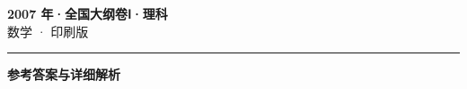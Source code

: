 \documentclass[zihao=5, a4paper]{ctexart}
\begin{document}
\begin{center}
  {\Large\bfseries 2007 年·全国大纲卷Ⅰ·理科}\\[4pt]
  {\large 数学 · 印刷版}
\end{center}
\medskip
{}

\par\bigskip\hrule\bigskip
{}
\begin{center}{\large\bfseries 参考答案与详细解析}\end{center}
\smallskip

\end{document}
